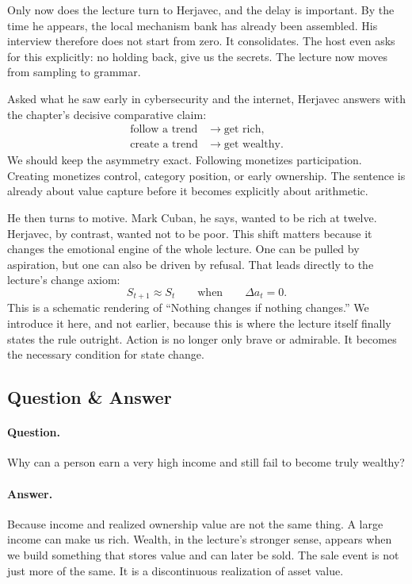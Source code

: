 Only now does the lecture turn to Herjavec, and the delay is important. By the time he appears, the local mechanism bank has already been assembled. His interview therefore does not start from zero. It consolidates. The host even asks for this explicitly: no holding back, give us the secrets. The lecture now moves from sampling to grammar.

Asked what he saw early in cybersecurity and the internet, Herjavec answers with the chapter's decisive comparative claim:
\begin{align}
\text{follow a trend} &\to \text{get rich},\\
\text{create a trend} &\to \text{get wealthy}.
\end{align}
We should keep the asymmetry exact. Following monetizes participation. Creating monetizes control, category position, or early ownership. The sentence is already about value capture before it becomes explicitly about arithmetic.

He then turns to motive. Mark Cuban, he says, wanted to be rich at twelve. Herjavec, by contrast, wanted not to be poor. This shift matters because it changes the emotional engine of the whole lecture. One can be pulled by aspiration, but one can also be driven by refusal. That leads directly to the lecture's change axiom:
\begin{equation}
S_{t+1} \approx S_t
\qquad
\text{when}
\qquad
\Delta a_t = 0.
\end{equation}
This is a schematic rendering of ``Nothing changes if nothing changes.'' We introduce it here, and not earlier, because this is where the lecture itself finally states the rule outright. Action is no longer only brave or admirable. It becomes the necessary condition for state change.

\subsection{Question \& Answer}

\paragraph{Question.} Why can a person earn a very high income and still fail to become truly wealthy?

\paragraph{Answer.} Because income and realized ownership value are not the same thing. A large income can make us rich. Wealth, in the lecture's stronger sense, appears when we build something that stores value and can later be sold. The sale event is not just more of the same. It is a discontinuous realization of asset value.

